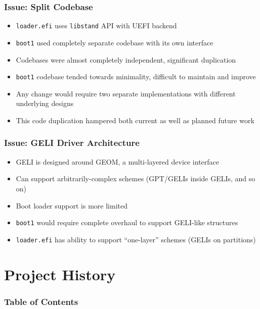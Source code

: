 \documentclass{beamer}
\begin{document}
\begin{frame}
  \frametitle{Issue: Split Codebase}
  \begin{itemize}
  \item \texttt{loader.efi} uses \texttt{libstand} API with UEFI backend
  \item \texttt{boot1} used completely separate codebase with its own interface
  \item Codebases were almost completely independent, significant duplication
  \item \texttt{boot1} codebase tended towards minimality, difficult
    to maintain and improve
  \item Any change would require two separate implementations with
    different underlying designs
  \item This code duplication hampered both current as well as planned
    future work
  \end{itemize}
\end{frame}

\begin{frame}
  \frametitle{Issue: GELI Driver Architecture}
  \begin{itemize}
  \item GELI is designed around GEOM, a multi-layered device interface
  \item Can support arbitrarily-complex schemes (GPT/GELIs inside
    GELIs, and so on)
  \item Boot loader support is more limited
  \item \texttt{boot1} would require complete overhaul to support
    GELI-like structures
  \item \texttt{loader.efi} has ability to support ``one-layer''
    schemes (GELIs on partitions)
  \end{itemize}
\end{frame}

\section{Project History}

\begin{frame}
  \frametitle{Table of Contents}
  \tableofcontents[currentsection]
\end{frame}
\end{document}
